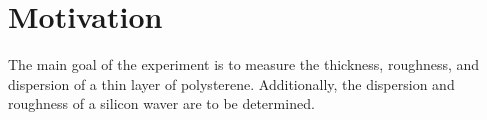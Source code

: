\section{Motivation}
\label{sec:Motivation}

The main goal of the experiment is to measure the thickness, roughness, and dispersion of a thin layer of polysterene.
Additionally, the dispersion and roughness of a silicon waver are to be determined.